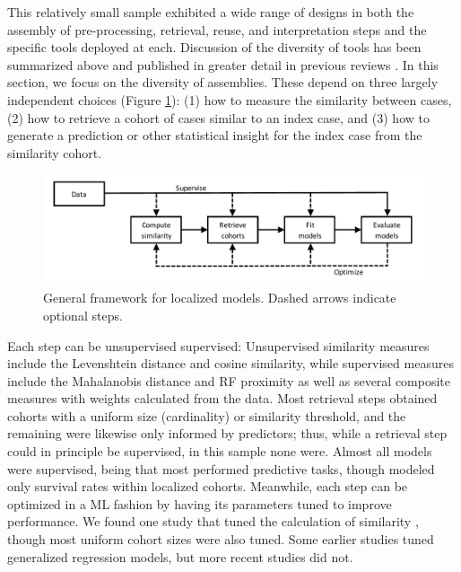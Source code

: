 \documentclass[sn-mathphys,Numbered,pdflatex]{sn-jnl}
\theoremstyle{remark}
\theoremstyle{definition}
\newcommand{\hl}[1]{#1}
\begin{document}
This relatively small sample exhibited a wide range of
\hl{designs in both the assembly of pre-processing, retrieval, reuse, and interpretation steps and the specific tools deployed at each}.
Discussion of the \hl{diversity} of \hl{tools} has been summarized above
and published in greater detail in previous reviews
\citep{Choudhury2016, Sharafoddini2017, Parimbelli2018}\hl{. In this section, we focus on the diversity of assemblies. These depend on}
three largely independent choices
\hl{(Figure }\ref{fig:framework}\hl{)}: (1) how to measure the
similarity between cases, (2) how to retrieve a cohort of cases similar
to an index case, and (3) how to generate a prediction or other
statistical insight for the index case from the similarity cohort.

\begin{figure}

{\centering \includegraphics[width=1\linewidth]{Fig5} 

}

\caption{General framework for localized models.
 Dashed arrows indicate optional steps.}\label{fig:framework}
\end{figure}

Each step can be unsupervised supervised: Unsupervised similarity
measures include \hl{the} Levenshtein distance and \hl{cosine}
similarity, while supervised measures include the Mahalanobis distance
and \hl{RF} proximity as well as several composite measures with weights
calculated from the data. Most retrieval steps obtained cohorts with a
uniform size (cardinality) or similarity threshold, and the remaining
were likewise only informed by predictors; thus, while a retrieval step
could in principle be supervised, in this sample none were. Almost all
models were supervised, being that most performed predictive tasks,
though \citet{Mariuzzi1997} modeled only survival rates within localized
cohorts. Meanwhile, each step can be optimized in a ML fashion by having
its parameters tuned to improve performance. We found one study that
tuned the calculation of similarity \citep{Liu2022}, though most uniform
cohort sizes were also tuned. Some earlier studies tuned generalized
regression models, but more recent studies did not.
\end{document}

